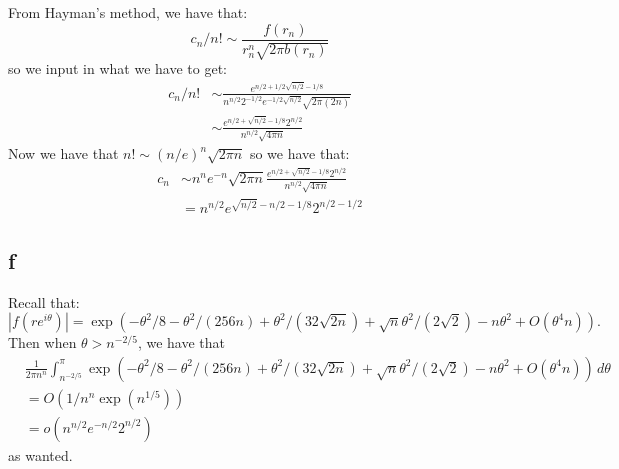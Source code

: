 \documentclass[]{article}
\begin{document}
From Hayman's method, we have that:
\begin{equation}
	c_n/n! \sim \frac{f(r_n)}{r_n^n \sqrt{2 \pi b(r_n)}}
\end{equation}
so we input in what we have to get:
\begin{align}
	c_n/n! &\sim \frac{e^{n/2 + 1/2 \sqrt{n/2} - 1/8}}{n^{n/2} 2^{-1/2} e^{-1/2 \sqrt{n/2}} \sqrt{2 \pi (2n)}}\\
	&\sim 
	\frac{e^{n/2 + \sqrt{n/2} - 1/8} 2^{n/2}}{n^{n/2} \sqrt{4 \pi n}}
\end{align}
Now we have that $n! \sim (n/e)^n \sqrt{2 \pi n}$ so we have that:
\begin{align}
	c_n &\sim n^n e^{-n} \sqrt{2 \pi n}\frac{e^{n/2 + \sqrt{n/2} - 1/8} 2^{n/2}}{n^{n/2} \sqrt{4 \pi n}}\\
	&=
	n^{n/2} e^{\sqrt{n/2} - n/2 - 1/8} 2^{n/2 - 1/2}
\end{align}


\subsection{f}
Recall that:
\begin{equation}
	|f(r e^{i \theta})| = \exp(
	-\theta^2/8 - \theta^2/(256n) + \theta^2/(32 \sqrt{2n}) + \sqrt{n} \theta^2/(2 \sqrt{2}) - n \theta^2 + O(\theta^4 n)
	).
\end{equation}
Then when $\theta > n^{-2/5}$, we have that 
\begin{align*}
	&\frac{1}{2 \pi n^n} \int^\pi_{n^{-2/5}} \exp(
	-\theta^2/8 - \theta^2/(256n) + \theta^2/(32 \sqrt{2n}) + \sqrt{n} \theta^2/(2 \sqrt{2}) - n \theta^2 + O(\theta^4 n)
	) \, d\theta \\
	&= O(1/n^n \exp(n^{1/5}))\\
	&= o(n^{n/2} e^{-n/2} 2^{n/2})
\end{align*}
as wanted. 
\end{document}

